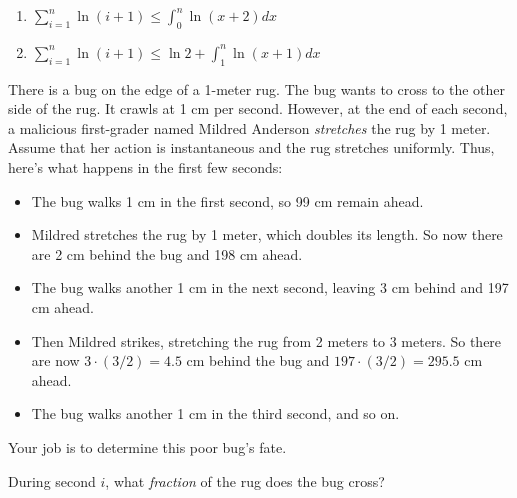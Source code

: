 \documentclass[12pt,twoside]{article}
\begin{document}
\begin{problem}{10}
\begin{enumerate}

\item $\displaystyle \sum_{i=1}^n \ln (i+1) \le \int_0^n \ln(x+2)
dx $

\item $\displaystyle \sum_{i=1}^n \ln (i+1) \le \ln 2 + \int_1^n
\ln(x+1) dx $

\end{enumerate}

\eparts

\end{problem}


 
\begin{problem}{15}
There is a bug on the edge of a 1-meter rug.  The bug wants to cross
to the other side of the rug.  It crawls at 1 cm per second.  However,
at the end of each second, a malicious first-grader named Mildred
Anderson \textit{stretches} the rug by 1 meter.  Assume that her
action is instantaneous and the rug stretches uniformly.  Thus, here's
what happens in the first few seconds:

\begin{itemize}

\item The bug walks 1 cm in the first second, so 99 cm remain ahead.

\item Mildred stretches the rug by 1 meter, which doubles its length.
So now there are 2 cm behind the bug and 198 cm ahead.

\item The bug walks another 1 cm in the next second, leaving 3 cm
behind and 197 cm ahead.

\item Then Mildred strikes, stretching the rug from 2 meters to 3
meters.  So there are now $3 \cdot (3 / 2) = 4.5$ cm behind the bug
and $197 \cdot (3/2) = 295.5$ cm ahead.

\item The bug walks another 1 cm in the third second, and so on.

\end{itemize}

Your job is to determine this poor bug's fate.

\bparts

During second $i$, what \textit{fraction} of the rug does the
bug cross?



\end{problem}
\end{document}
